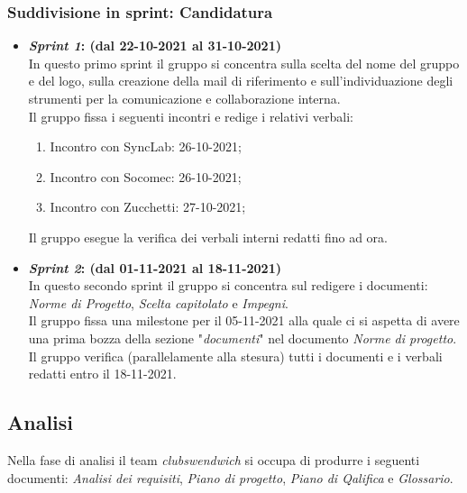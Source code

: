 \subsubsection{Suddivisione in sprint: Candidatura}
\begin{itemize}
    \item \textbf{\textit{Sprint 1}: (dal 22-10-2021 al 31-10-2021)}\\
    In questo primo sprint il gruppo si concentra sulla scelta del nome del gruppo e del logo, sulla creazione della mail di riferimento e sull'individuazione degli strumenti per la comunicazione e collaborazione interna.\\
    Il gruppo fissa i seguenti incontri e redige i relativi verbali:
    \begin{enumerate}
        \item Incontro con SyncLab: 26-10-2021;
        \item Incontro con Socomec: 26-10-2021;
        \item Incontro con Zucchetti: 27-10-2021; 
    \end{enumerate}
    Il gruppo esegue la verifica dei verbali interni redatti fino ad ora.

    \item \textbf{\textit{Sprint 2}: (dal 01-11-2021 al 18-11-2021)}\\
    In questo secondo sprint il gruppo si concentra sul redigere i documenti: \textit{Norme di Progetto}, \textit{Scelta capitolato} e \textit{Impegni}.
    \\Il gruppo fissa una milestone per il 05-11-2021 alla quale ci si aspetta di avere una prima bozza della sezione "\textit{documenti}" nel documento \textit{Norme di progetto}. \\
    Il gruppo verifica (parallelamente alla stesura) tutti i documenti e i verbali redatti entro il 18-11-2021.
\end{itemize}

\newpage
\subsection{Analisi}
Nella fase di analisi il team \textit{clubswendwich} si occupa di produrre i seguenti documenti: \textit{Analisi dei requisiti}, \textit{Piano di progetto}, \textit{Piano di Qalifica} e \textit{Glossario}.

